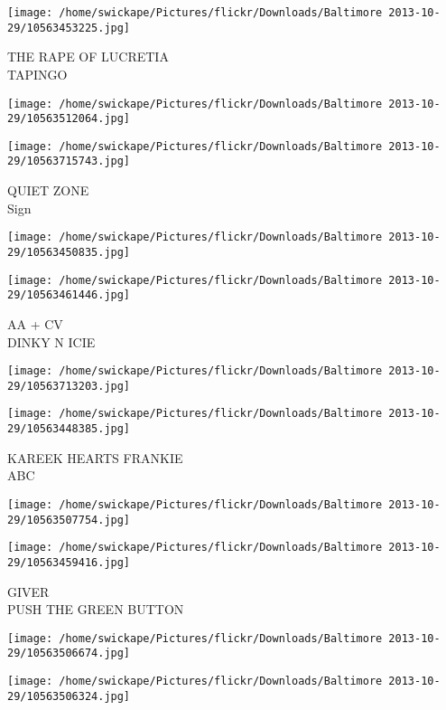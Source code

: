 \documentclass[10pt,letterpaper]{article}
\begin{document}
\vspace{0.25in}
\texttt{[image: /home/swickape/Pictures/flickr/Downloads/Baltimore 2013-10-29/10563453225.jpg]}

THE RAPE OF LUCRETIA\\
TAPINGO
\pagebreak

\texttt{[image: /home/swickape/Pictures/flickr/Downloads/Baltimore 2013-10-29/10563512064.jpg]}

\vspace{0.25in}
\texttt{[image: /home/swickape/Pictures/flickr/Downloads/Baltimore 2013-10-29/10563715743.jpg]}

QUIET ZONE\\
Sign
\pagebreak

\texttt{[image: /home/swickape/Pictures/flickr/Downloads/Baltimore 2013-10-29/10563450835.jpg]}

\vspace{0.25in}
\texttt{[image: /home/swickape/Pictures/flickr/Downloads/Baltimore 2013-10-29/10563461446.jpg]}

AA + CV\\
DINKY N ICIE
\pagebreak

\texttt{[image: /home/swickape/Pictures/flickr/Downloads/Baltimore 2013-10-29/10563713203.jpg]}

\vspace{0.25in}
\texttt{[image: /home/swickape/Pictures/flickr/Downloads/Baltimore 2013-10-29/10563448385.jpg]}

KAREEK HEARTS FRANKIE\\
ABC
\pagebreak

\texttt{[image: /home/swickape/Pictures/flickr/Downloads/Baltimore 2013-10-29/10563507754.jpg]}

\vspace{0.25in}
\texttt{[image: /home/swickape/Pictures/flickr/Downloads/Baltimore 2013-10-29/10563459416.jpg]}

GIVER\\
PUSH THE GREEN BUTTON
\pagebreak

\texttt{[image: /home/swickape/Pictures/flickr/Downloads/Baltimore 2013-10-29/10563506674.jpg]}

\vspace{0.25in}
\texttt{[image: /home/swickape/Pictures/flickr/Downloads/Baltimore 2013-10-29/10563506324.jpg]}
\end{document}
